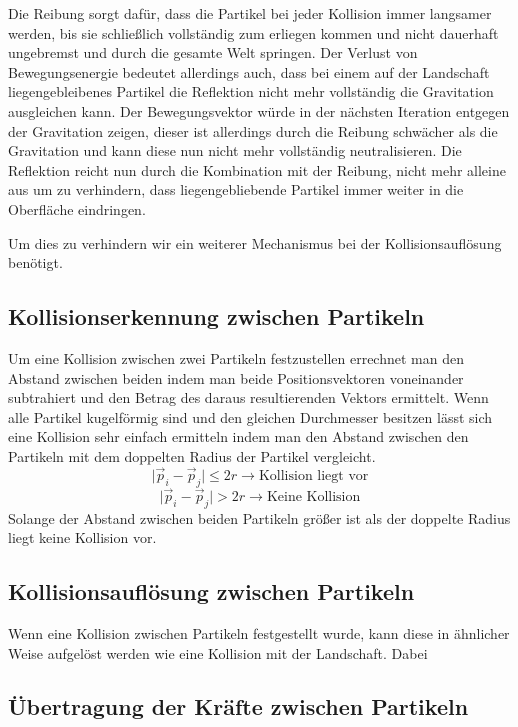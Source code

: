 \begin{Spacing}{\mylinespace}
		Die Reibung sorgt dafür, dass die Partikel bei jeder Kollision immer langsamer
		werden, bis sie schließlich vollständig zum erliegen kommen und
		nicht dauerhaft ungebremst und durch die gesamte Welt springen.
		Der Verlust von Bewegungsenergie bedeutet allerdings auch, dass bei einem auf der
		Landschaft liegengebleibenes Partikel die Reflektion nicht mehr vollständig die
		Gravitation ausgleichen kann. Der Bewegungsvektor würde in der
		nächsten Iteration entgegen der Gravitation zeigen, dieser ist allerdings durch die Reibung
		schwächer als die Gravitation und kann diese nun nicht mehr vollständig neutralisieren. Die Reflektion
		reicht nun durch die Kombination mit der Reibung, nicht mehr alleine aus
		um zu verhindern, dass liegengebliebende Partikel immer weiter in die Oberfläche eindringen.

		Um dies zu verhindern wir ein weiterer Mechanismus bei der Kollisionsauflösung benötigt.



    \subsection{Kollisionserkennung zwischen Partikeln}
    	Um eine Kollision zwischen zwei Partikeln festzustellen errechnet man
    	den Abstand zwischen beiden indem man beide Positionsvektoren voneinander
    	subtrahiert und den Betrag des daraus resultierenden Vektors ermittelt.
    	Wenn alle Partikel kugelförmig sind und den gleichen Durchmesser besitzen
    	lässt sich eine Kollision sehr einfach ermitteln indem man den Abstand
    	zwischen den Partikeln mit dem doppelten Radius der Partikel vergleicht.
    	\[ \vert \vec{p}_{i} - \vec{p}_{j} \vert \leq 2r \rightarrow \textrm{Kollision liegt vor} \]
    	\[ \vert \vec{p}_{i} - \vec{p}_{j} \vert > 2r \rightarrow \textrm{Keine Kollision} \]
    	Solange der Abstand zwischen beiden Partikeln größer ist als der
    	doppelte Radius liegt keine Kollision vor.
    \subsection{Kollisionsauflösung zwischen Partikeln}
    	Wenn eine Kollision zwischen Partikeln festgestellt wurde, kann diese in
    	ähnlicher Weise aufgelöst werden wie eine Kollision mit der Landschaft.
    	Dabei
    \subsection{Übertragung der Kräfte zwischen Partikeln}
\end{Spacing}
\newpage
\clearpage
